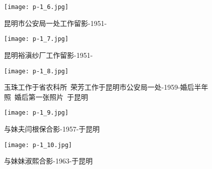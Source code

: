 \clearpage


\begin{figure}
    \begin{center}
        \texttt{[image: p-1\_6.jpg]}
        \begin{shaded}
            \caption{昆明市公安局一处工作留影-1951-}
        \end{shaded}
    \end{center}
\end{figure}

\clearpage


\begin{figure}
    \begin{center}
        \texttt{[image: p-1\_7.jpg]}
        \begin{shaded}
            \caption{昆明裕滇纱厂工作留影-1951-}
        \end{shaded}
    \end{center}
\end{figure}

\clearpage


\begin{figure}
    \begin{center}
        \texttt{[image: p-1\_8.jpg]}
        \begin{shaded}
            \caption{玉珠工作于省农科所~荣芳工作于昆明市公安局一处-1959-婚后半年照~婚后第一张照片~于昆明}
        \end{shaded}
    \end{center}
\end{figure}

\clearpage


\begin{figure}
    \begin{center}
        \texttt{[image: p-1\_9.jpg]}
        \begin{shaded}
            \caption{与妹夫闫根保合影-1957-于昆明}
        \end{shaded}
    \end{center}
\end{figure}

\clearpage


\begin{figure}
    \begin{center}
        \texttt{[image: p-1\_10.jpg]}
        \begin{shaded}
            \caption{与妹妹淑熙合影-1963-于昆明}
        \end{shaded}
    \end{center}
\end{figure}

